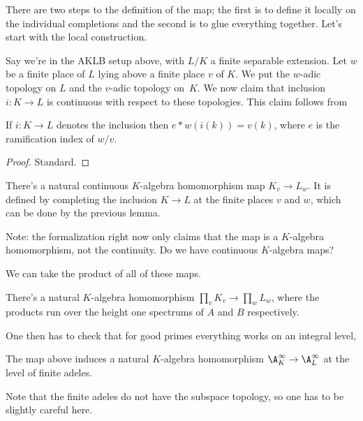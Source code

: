 There are two steps to the definition of the map; the first is to define it locally
on the individual completions and the second is to glue everything together. Let's
start with the local construction.

Say we're in the AKLB setup above, with $L/K$ a finite separable extension.
Let $w$ be a finite place of $L$ lying above a finite place $v$ of $K$.
We put the $w$-adic topology on $L$ and the $v$-adic topology on~$K$. We now claim
that inclusion $i:K\to L$ is continuous with respect to these topologies. This
claim follows from

\begin{lemma} If $i:K\to L$ denotes the inclusion then $e*w(i(k))=v(k)$, where
  $e$ is the ramification index of $w/v$.
  \label{IsDedekindDomain.HeightOneSpectrum.valuation_comap}
\end{lemma}
\begin{proof}
   Standard.
\end{proof}

\begin{definition}
  \label{IsDedekindDomain.HeightOneSpectrum.adicCompletion_comap_algHom}
  There's a natural continuous $K$-algebra homomorphism map $K_v\to L_w$. It is defined by completing
  the inclusion $K\to L$ at the finite places $v$ and $w$, which can be done
  by the previous lemma.
\end{definition}

Note: the formalization right now only claims that the map is a $K$-algebra homomorphism,
not the continuity. Do we have continuous $K$-algebra maps?

We can take the product of all of these maps.

\begin{definition}
  \label{DedekindDomain.ProdAdicCompletions.baseChange}
  There's a natural $K$-algebra homomorphism $\prod_v K_v\to\prod_w L_w$, where the
  products run over the height one spectrums of $A$ and $B$ respectively.
\end{definition}

One then has to check that for good primes everything works on an integral level,

\begin{definition}
  The map above induces a natural $K$-algebra homomorphism $\A_K^\infty\to\A_L^\infty$
  at the level of finite adeles.
\end{definition}

Note that the finite adeles do not have the subspace topology, so one has to be slightly
careful here.
